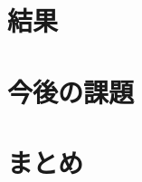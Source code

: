 \documentclass[titlepage]{jsarticle}
\begin{document}






















\section{結果}










\section{今後の課題}











\section{まとめ}
\end{document}
